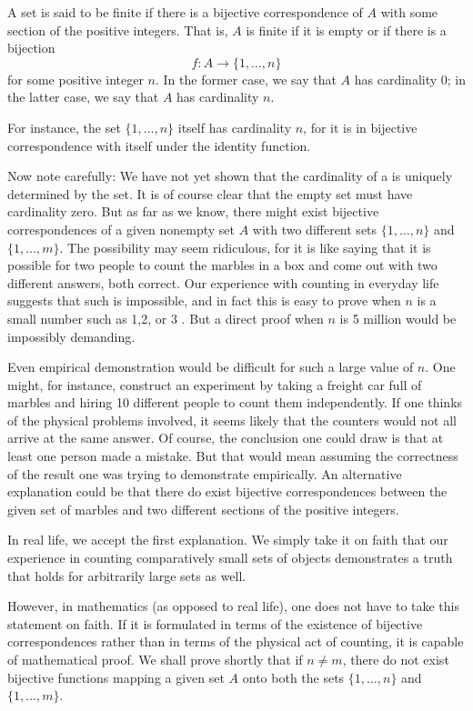 \begin{definition}
 A set is said to be finite if there is a bijective correspondence of \(A\) with some section of the positive integers. That is, \(A\) is finite if it is empty or if there is a bijection
 \[
 f : A \rightarrow \{1,\ldots, n\}
 \]
 for some positive integer \(n\). In the former case, we say that \(A\) has cardinality 0; in the latter case, we say that \(A\) has cardinality \(n\).
\end{definition}

For instance, the set \(\{1,\ldots, n\}\) itself has cardinality \(n\), 
for it is in bijective correspondence with itself under the identity function.

Now note carefully: We have not yet shown that the cardinality of a  is 
uniquely determined by the set. It is of course clear that the empty set must have 
cardinality zero. But as far as we know, there might exist bijective correspondences 
of a given nonempty set \(A\) with two different sets \(\{1,\ldots, n\}\) and 
\(\{1,\ldots, m\}\). The possibility may seem ridiculous, for it is like saying that it is 
possible for two people to count the marbles in a box and come out with two different answers, 
both correct. Our experience with counting in everyday life suggests that such is impossible, 
and in fact this is easy to prove when \(n\) is a small number such as 1,2, or 3 . 
But a direct proof when \(n\) is 5 million would be impossibly demanding.

Even empirical demonstration would be difficult for such a large value of \(n\). 
One might, for instance, construct an experiment by taking a freight car full of 
marbles and hiring 10 different people to count them independently. 
If one thinks of the physical problems involved, it seems likely that the counters would 
not all arrive at the same answer. Of course, the conclusion one could draw is that at 
least one person made a mistake. But that would mean assuming the correctness of the result 
one was trying to demonstrate empirically. An alternative explanation could be that there 
do exist bijective correspondences between the given set of marbles and two different sections 
of the positive integers.

In real life, we accept the first explanation. We simply take it on faith that our experience 
in counting comparatively small sets of objects demonstrates a truth that holds for 
arbitrarily large sets as well.

However, in mathematics (as opposed to real life), one does not have to take this statement 
on faith. If it is formulated in terms of the existence of bijective correspondences rather 
than in terms of the physical act of counting, it is capable of mathematical proof. 
We shall prove shortly that if \(n \neq m\), there do not exist bijective functions 
mapping a given set \(A\) onto both the sets \(\{1,\ldots, n\}\) and \(\{1,\ldots, m\}\).

